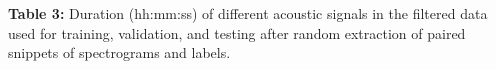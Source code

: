 \documentclass[11pt]{article}
\begin{document}
\begin{table}[h]
    \centering
    \caption*{\textbf{Table 3:} Duration (hh:mm:ss) of different acoustic signals in the filtered data used for training, validation, and testing after random extraction of paired snippets of spectrograms and labels.}
    \small
    
\end{table}
\end{document}
